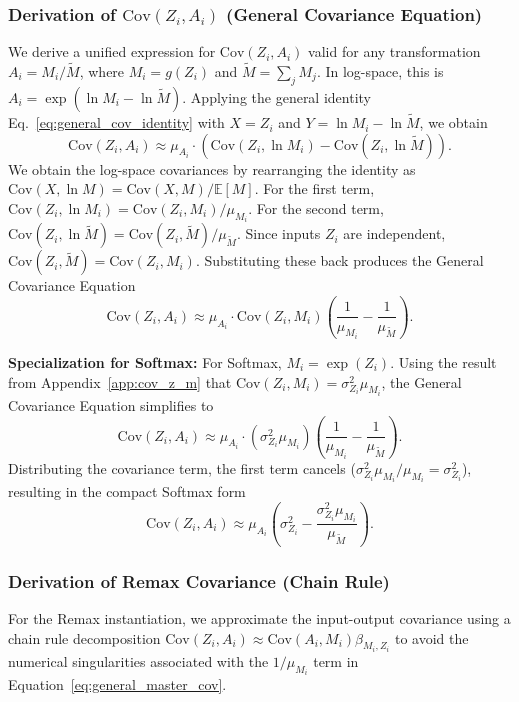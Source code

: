 \documentclass{uai2026} %
\begin{document}
\subsubsection{Derivation of $\mathrm{Cov}(Z_i, A_i)$ (General Covariance Equation)}\label{app:cov_a_z}
We derive a unified expression for $\text{Cov}(Z_i, A_i)$ valid for any transformation $A_i = M_i / \tilde{M}$, where $M_i = g(Z_i)$ and $\tilde{M} = \sum_j M_j$. In log-space, this is $A_i = \exp(\ln M_i - \ln \tilde{M})$.
Applying the general identity Eq.~\eqref{eq:general_cov_identity} with $X=Z_i$ and $Y = \ln M_i - \ln \tilde{M}$, we obtain
\begin{equation*}
\text{Cov}(Z_i, A_i) \approx \mu_{A_i} \cdot \left( \text{Cov}(Z_i, \ln M_i) - \text{Cov}(Z_i, \ln \tilde{M}) \right).
\end{equation*}
We obtain the log-space covariances by rearranging the identity as $\text{Cov}(X, \ln M) = \text{Cov}(X, M)/\mathbb{E}[M]$. For the first term, $\text{Cov}(Z_i, \ln M_i) = \text{Cov}(Z_i, M_i) / \mu_{M_i}$. For the second term, $\text{Cov}(Z_i, \ln \tilde{M}) = \text{Cov}(Z_i, \tilde{M}) / \mu_{\tilde{M}}$. Since inputs $Z_i$ are independent, $\text{Cov}(Z_i, \tilde{M}) = \text{Cov}(Z_i, M_i)$.
Substituting these back produces the General Covariance Equation
\begin{equation}
\label{eq:general_master_cov}
\text{Cov}(Z_i, A_i) \approx \mu_{A_i} \cdot \text{Cov}(Z_i, M_i) \left( \frac{1}{\mu_{M_i}} - \frac{1}{\mu_{\tilde{M}}} \right).
\end{equation}

\textbf{Specialization for Softmax:}
For Softmax, $M_i = \exp(Z_i)$. Using the result from Appendix~\ref{app:cov_z_m} that $\text{Cov}(Z_i, M_i) = \sigma_{Z_i}^2 \mu_{M_i}$, the General Covariance Equation simplifies to
\begin{equation*}
\text{Cov}(Z_i, A_i) \approx \mu_{A_i} \cdot (\sigma_{Z_i}^2 \mu_{M_i}) \left( \frac{1}{\mu_{M_i}} - \frac{1}{\mu_{\tilde{M}}} \right).
\end{equation*}
Distributing the covariance term, the first term cancels ($\sigma_{Z_i}^2 \mu_{M_i} / \mu_{M_i} = \sigma_{Z_i}^2$), resulting in the compact Softmax form
\begin{equation*}
\text{Cov}(Z_i, A_i) \approx \mu_{A_i} \left( \sigma_{Z_i}^2 - \frac{\sigma_{Z_i}^2 \mu_{M_i}}{\mu_{\tilde{M}}} \right).
\end{equation*}

\subsubsection{Derivation of Remax Covariance (Chain Rule)}\label{app:cov_remax_chain}
For the Remax instantiation, we approximate the input-output covariance using a chain rule decomposition $\text{Cov}(Z_i, A_i) \approx \text{Cov}(A_i, M_i) \beta_{M_i, Z_i}$ to avoid the numerical singularities associated with the $1/\mu_{M_i}$ term in Equation~\ref{eq:general_master_cov}.
\end{document}
